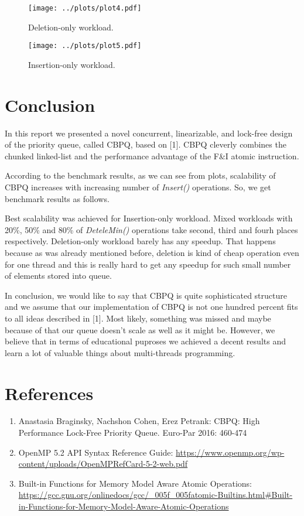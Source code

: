 \documentclass{article}
\begin{document}
\begin{figure}[H]
  \centering
  \texttt{[image: ../plots/plot4.pdf]}
  \caption{Deletion-only workload.}
  \label{fig:plot4}
\end{figure}

\begin{figure}[H]
  \centering
  \texttt{[image: ../plots/plot5.pdf]}
  \caption{Insertion-only workload.}
  \label{fig:plot5}
\end{figure}

\section{Conclusion}
In this report we presented a novel concurrent, linearizable, and lock-free design of the priority queue, called CBPQ, based on [1]. CBPQ cleverly combines the chunked linked-list and the performance advantage of the F\&I atomic instruction.\par
According to the benchmark results, as we can see from plots, scalability of CBPQ increases with increasing number of \textit{Insert()} operations. So, we get benchmark results as follows.\par
Best scalability was achieved for Insertion-only workload. Mixed workloads with 20\%, 50\% and 80\% of \textit{DeteleMin()} operations take second, third and fourh places respectively. Deletion-only workload barely has any speedup. That happens because as was already mentioned before, deletion is kind of cheap operation even for one thread and this is really hard to get any speedup for such small number of elements stored into queue.\par
In conclusion, we would like to say that CBPQ is quite sophisticated structure and we assume that our implementation of CBPQ is not one hundred percent fits to all ideas described in [1]. Most likely, something was missed and maybe because of that our queue doesn't scale as well as it might be. However, we believe that in terms of educational puproses we achieved a decent results and learn a lot of valuable things about multi-threads programming.

\pagebreak
\section*{References}
\begin{enumerate}
\item{Anastasia Braginsky, Nachshon Cohen, Erez Petrank: CBPQ: High Performance Lock-Free Priority Queue. Euro-Par 2016: 460-474}
\item{OpenMP 5.2 API Syntax Reference Guide: \url{https://www.openmp.org/wp-content/uploads/OpenMPRefCard-5-2-web.pdf}}
\item{Built-in Functions for Memory Model Aware Atomic Operations: \url{https://gcc.gnu.org/onlinedocs/gcc/_005f_005fatomic-Builtins.html#Built-in-Functions-for-Memory-Model-Aware-Atomic-Operations}}
\end{enumerate}
\end{document}
